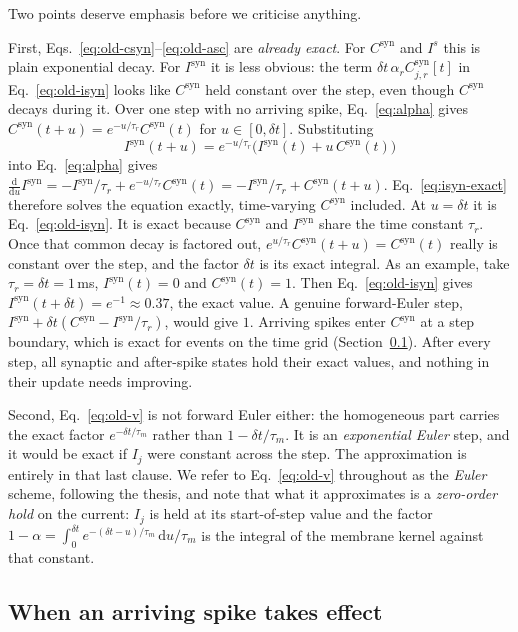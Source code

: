 \documentclass[11pt,a4paper,numbers=noenddot]{scrartcl}
\newcommand{\dt}{\delta t}
\newcommand{\Isyn}{I^{\mathrm{syn}}}
\newcommand{\Csyn}{C^{\mathrm{syn}}}
\newcommand{\amem}{\alpha}
\newcommand{\asyn}{\alpha_{r}}
\begin{document}
Two points deserve emphasis before we criticise anything.

First, Eqs.~\eqref{eq:old-csyn}--\eqref{eq:old-asc} are \emph{already
exact}. For $\Csyn$ and $I^{s}$ this is plain exponential decay. For $\Isyn$
it is less obvious: the term $\dt\,\asyn\Csyn_{j,r}[t]$ in
Eq.~\eqref{eq:old-isyn} looks like $\Csyn$ held constant over the step, even
though $\Csyn$ decays during it. Over one step with no arriving spike,
Eq.~\eqref{eq:alpha} gives $\Csyn(t+u) = e^{-u/\tau_r}\Csyn(t)$ for
$u\in[0,\dt]$. Substituting
%
\begin{equation}
\label{eq:isyn-exact}
\Isyn(t+u) = e^{-u/\tau_r}\bigl(\Isyn(t) + u\,\Csyn(t)\bigr)
\end{equation}
%
into Eq.~\eqref{eq:alpha} gives
$\frac{\mathrm{d}}{\mathrm{d}u}\Isyn = -\Isyn/\tau_r + e^{-u/\tau_r}\Csyn(t)
= -\Isyn/\tau_r + \Csyn(t+u)$. Eq.~\eqref{eq:isyn-exact} therefore solves the
equation exactly, time-varying $\Csyn$ included. At $u=\dt$ it is
Eq.~\eqref{eq:old-isyn}. It is exact because $\Csyn$ and $\Isyn$ share the
time constant $\tau_r$. Once that common decay is factored out,
$e^{u/\tau_r}\Csyn(t+u) = \Csyn(t)$ really is constant over the step, and
the factor $\dt$ is its exact integral. As an example, take
$\tau_r = \dt = 1\,$ms, $\Isyn(t)=0$ and $\Csyn(t)=1$. Then
Eq.~\eqref{eq:old-isyn} gives $\Isyn(t+\dt) = e^{-1} \approx 0.37$, the
exact value. A genuine forward-Euler step,
$\Isyn + \dt(\Csyn - \Isyn/\tau_r)$, would give $1$. Arriving spikes enter
$\Csyn$ at a step boundary, which is exact for events on the time grid
(Section~\ref{sec:arrival}). After every step, all synaptic and after-spike
states hold their exact values, and nothing in their update needs
improving.

Second, Eq.~\eqref{eq:old-v} is not forward Euler either: the homogeneous
part carries the exact factor $e^{-\dt/\tau_m}$ rather than
$1-\dt/\tau_m$. It is an \emph{exponential Euler} step, and it would be exact
if $I_j$ were constant across the step. The approximation is entirely in that
last clause. We refer to Eq.~\eqref{eq:old-v} throughout as the \emph{Euler}
scheme, following the thesis, and note that what it approximates is a
\emph{zero-order hold} on the current: $I_j$ is held at its start-of-step value and the factor
$1-\amem = \int_0^{\dt} e^{-(\dt-u)/\tau_m}\,\mathrm{d}u / \tau_m$
is the integral of the membrane kernel against that constant.

\subsection{When an arriving spike takes effect}
\label{sec:arrival}
\end{document}
